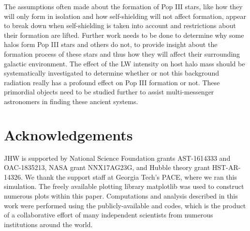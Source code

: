 \documentclass[a4paper,fleqn,usenatbib]{mnras}
\begin{document}
The assumptions often made about the formation of Pop III stars, like how they will only form in isolation and how \hh{} self-shielding will not affect formation, appear to break down when self-shielding is taken into account and restrictions about their formation are lifted. Further work needs to be done to determine why some halos form Pop III stars and others do not, to provide insight about the formation process of these stars and thus how they will affect their surrounding galactic environment. The effect of the LW intensity on host halo mass should be systematically investigated to determine whether or not this background radiation really has a profound effect on Pop III formation or not. These primordial objects need to be studied further to assist multi-messenger astronomers in finding these ancient systems. 

\section*{Acknowledgements}

JHW is supported by National Science Foundation grants AST-1614333 and OAC-1835213, NASA grant NNX17AG23G, and Hubble theory grant
HST-AR-14326.  We thank the support staff at Georgia Tech's PACE,
where we ran this simulation.  The freely available plotting library
{\sc matplotlib} \citep{matplotlib} was used to construct numerous
plots within this paper. Computations and analysis described in this
work were performed using the publicly-available \enzo{} and \yt{}
codes, which is the product of a collaborative effort of many
independent scientists from numerous institutions around the world.










\appendix



\bsp	%
\label{lastpage}
\end{document}
